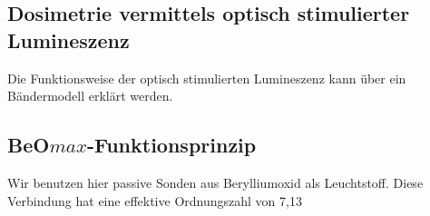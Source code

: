 \subsection{Dosimetrie vermittels optisch stimulierter Lumineszenz}

Die Funktionsweise der optisch stimulierten Lumineszenz kann über ein Bändermodell erklärt werden. 


\subsection{BeO$max$-Funktionsprinzip}
Wir benutzen hier passive Sonden aus Berylliumoxid als Leuchtstoff. Diese Verbindung hat eine effektive Ordnungszahl von 7,13